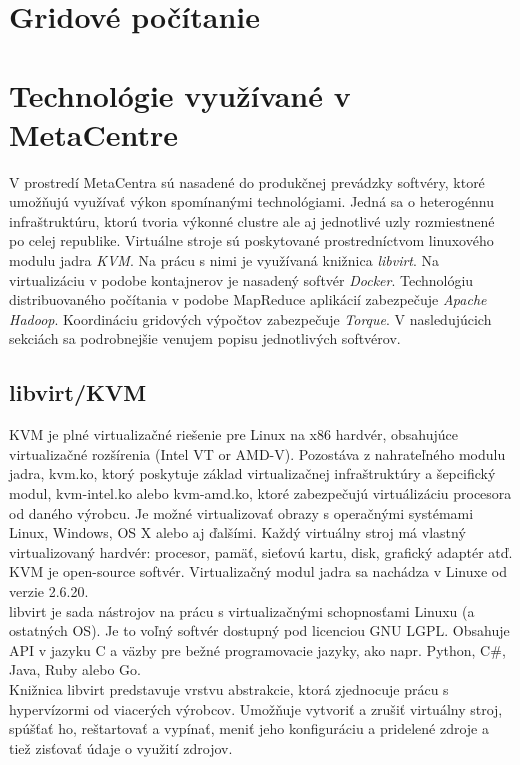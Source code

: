 \documentclass[printed,11pt,twoside,color,cover,table]{fithesis3}
\begin{document}
\section{Gridové počítanie}

\section{Technológie využívané v MetaCentre}
V prostredí MetaCentra sú nasadené do produkčnej prevádzky softvéry, ktoré umožňujú využívať výkon spomínanými technológiami. Jedná sa o heterogénnu infraštruktúru, ktorú tvoria výkonné clustre ale 
aj jednotlivé uzly rozmiestnené po celej republike. Virtuálne stroje sú poskytované prostredníctvom linuxového modulu jadra \textit{KVM}. Na prácu s nimi je využívaná knižnica \textit{libvirt}. 
Na virtualizáciu v podobe kontajnerov je nasadený softvér \textit{Docker}. Technológiu distribuovaného počítania v podobe MapReduce aplikácií zabezpečuje \textit{Apache Hadoop}.
Koordináciu gridových výpočtov zabezpečuje \textit{Torque}. V nasledujúcich sekciách sa podrobnejšie venujem popisu jednotlivých softvérov.
 
\subsection{libvirt/KVM}
\label{sec:kvm}
KVM je plné virtualizačné riešenie pre Linux na x86 hardvér, obsahujúce virtualizačné rozšírenia (Intel VT or AMD-V).
Pozostáva z nahrateľného modulu jadra, kvm.ko, ktorý poskytuje základ virtualizačnej infraštruktúry a šepcifický modul, kvm-intel.ko alebo kvm-amd.ko, ktoré zabezpečujú virtuálizáciu procesora od daného výrobcu.
Je možné virtualizovať obrazy s operačnými systémami Linux, Windows, OS X alebo aj ďalšími. Každý virtuálny stroj má vlastný virtualizovaný hardvér: procesor, pamäť, sieťovú kartu, disk, grafický adaptér atď. 
KVM je open-source softvér. Virtualizačný modul jadra sa nachádza v Linuxe od verzie 2.6.20.\cite{kvm}
\\libvirt je sada nástrojov na prácu s virtualizačnými schopnosťami Linuxu (a ostatných OS). Je to voľný softvér dostupný pod licenciou GNU LGPL. 
Obsahuje API v jazyku C a väzby pre bežné programovacie jazyky, ako napr. Python, C\#, Java, Ruby alebo Go.\cite{libvirt}
\\Knižnica libvirt predstavuje vrstvu abstrakcie, ktorá zjednocuje prácu s hypervízormi od viacerých výrobcov. Umožňuje vytvoriť a zrušiť virtuálny stroj, spúšťať ho, reštartovať a vypínať, meniť jeho konfiguráciu a pridelené zdroje a tiež zisťovať údaje o využití zdrojov.
\end{document}
